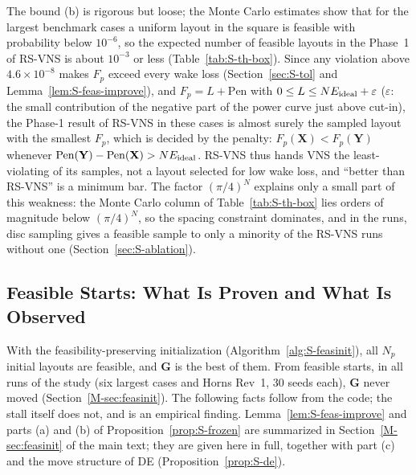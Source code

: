 The bound (b) is rigorous but loose; the Monte Carlo estimates show that for the largest benchmark cases a uniform layout in the square is feasible with probability below $10^{-6}$, so the expected number of feasible layouts in the Phase~1 of RS-VNS is about $10^{-3}$ or less (Table~\ref{tab:S-th-box}). Since any violation above $4.6\times10^{-8}$ makes $F_p$ exceed every wake loss (Section~\ref{sec:S-tol} and Lemma~\ref{lem:S-feas-improve}), and $F_p=L+\mathrm{Pen}$ with $0\le L\le NE_{\rm ideal}+\varepsilon$ ($\varepsilon$: the small contribution of the negative part of the power curve just above cut-in), the Phase-1 result of RS-VNS in these cases is almost surely the sampled layout with the smallest $F_p$, which is decided by the penalty: $F_p(\mathbf X)<F_p(\mathbf Y)$ whenever $\mathrm{Pen}(\mathbf Y)-\mathrm{Pen}(\mathbf X)>NE_{\rm ideal}$. RS-VNS thus hands VNS the least-violating of its samples, not a layout selected for low wake loss, and ``better than RS-VNS'' is a minimum bar. The factor $(\pi/4)^N$ explains only a small part of this weakness: the Monte Carlo column of Table~\ref{tab:S-th-box} lies orders of magnitude below $(\pi/4)^N$, so the spacing constraint dominates, and in the runs, disc sampling gives a feasible sample to only a minority of the RS-VNS runs without one (Section~\ref{sec:S-ablation}).

\subsection{Feasible Starts: What Is Proven and What Is Observed}
\label{sec:S-th-feas}
With the feasibility-preserving initialization (Algorithm~\ref{alg:S-feasinit}), all $N_p$ initial layouts are feasible, and $\mathbf G$ is the best of them. From feasible starts, in all runs of the study (six largest cases and Horns Rev~1, 30 seeds each), $\mathbf G$ never moved (Section~\ref{M-sec:feasinit}). The following facts follow from the code; the stall itself does not, and is an empirical finding. Lemma~\ref{lem:S-feas-improve} and parts (a) and (b) of Proposition~\ref{prop:S-frozen} are summarized in Section~\ref{M-sec:feasinit} of the main text; they are given here in full, together with part (c) and the move structure of DE (Proposition~\ref{prop:S-de}).


